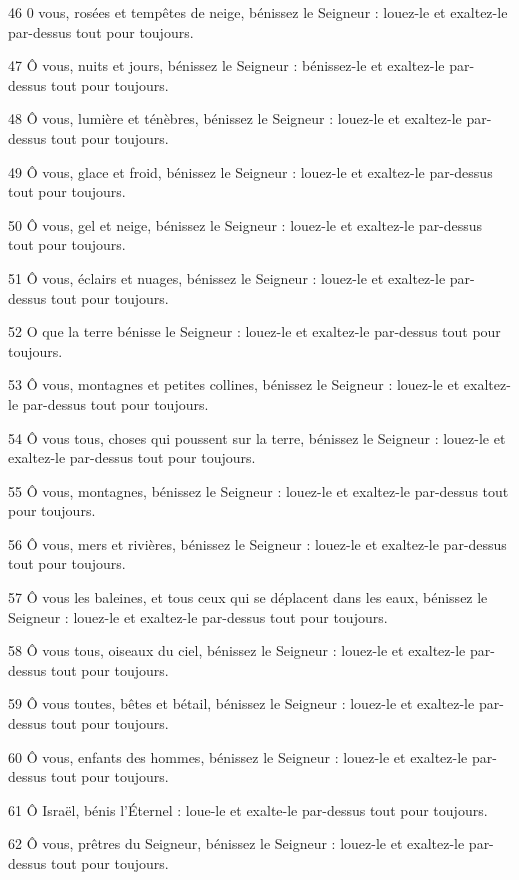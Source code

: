 \par 46 0 vous, rosées et tempêtes de neige, bénissez le Seigneur : louez-le et exaltez-le par-dessus tout pour toujours.
\par 47 Ô vous, nuits et jours, bénissez le Seigneur : bénissez-le et exaltez-le par-dessus tout pour toujours.
\par 48 Ô vous, lumière et ténèbres, bénissez le Seigneur : louez-le et exaltez-le par-dessus tout pour toujours.
\par 49 Ô vous, glace et froid, bénissez le Seigneur : louez-le et exaltez-le par-dessus tout pour toujours.
\par 50 Ô vous, gel et neige, bénissez le Seigneur : louez-le et exaltez-le par-dessus tout pour toujours.
\par 51 Ô vous, éclairs et nuages, bénissez le Seigneur : louez-le et exaltez-le par-dessus tout pour toujours.
\par 52 O que la terre bénisse le Seigneur : louez-le et exaltez-le par-dessus tout pour toujours.
\par 53 Ô vous, montagnes et petites collines, bénissez le Seigneur : louez-le et exaltez-le par-dessus tout pour toujours.
\par 54 Ô vous tous, choses qui poussent sur la terre, bénissez le Seigneur : louez-le et exaltez-le par-dessus tout pour toujours.
\par 55 Ô vous, montagnes, bénissez le Seigneur : louez-le et exaltez-le par-dessus tout pour toujours.
\par 56 Ô vous, mers et rivières, bénissez le Seigneur : louez-le et exaltez-le par-dessus tout pour toujours.
\par 57 Ô vous les baleines, et tous ceux qui se déplacent dans les eaux, bénissez le Seigneur : louez-le et exaltez-le par-dessus tout pour toujours.
\par 58 Ô vous tous, oiseaux du ciel, bénissez le Seigneur : louez-le et exaltez-le par-dessus tout pour toujours.
\par 59 Ô vous toutes, bêtes et bétail, bénissez le Seigneur : louez-le et exaltez-le par-dessus tout pour toujours.
\par 60 Ô vous, enfants des hommes, bénissez le Seigneur : louez-le et exaltez-le par-dessus tout pour toujours.
\par 61 Ô Israël, bénis l'Éternel : loue-le et exalte-le par-dessus tout pour toujours.
\par 62 Ô vous, prêtres du Seigneur, bénissez le Seigneur : louez-le et exaltez-le par-dessus tout pour toujours.

